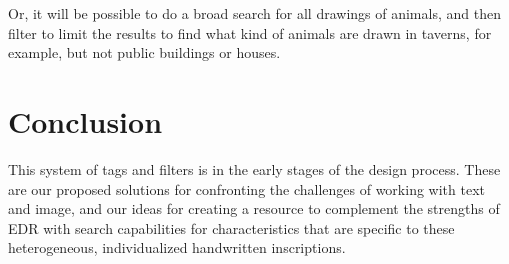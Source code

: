 \documentclass[amsthm,ebook]{saparticle}
\begin{document}
Or, it will be possible to do a broad search for all drawings of animals, and then filter to limit the results to find
what kind of animals are drawn in taverns, for example, but not public buildings or houses. \ 




\section{Conclusion}


\noindent  This system of tags and filters is in the early stages of the design process. These are our proposed solutions for
confronting the challenges of working with text and image, and our ideas for creating a resource to complement the
strengths of EDR with search capabilities for characteristics that are specific to these heterogeneous, individualized
handwritten inscriptions. 

\nocite{wallace-hadrill_herculaneum:_2011}
\nocite{vivolo_pompei:_1993}
\nocite{guadagno_supplemento_1978}
\nocite{guadagno_supplemento_1981}
\nocite{della_corte_iscrizioni_1958}



\end{document}
